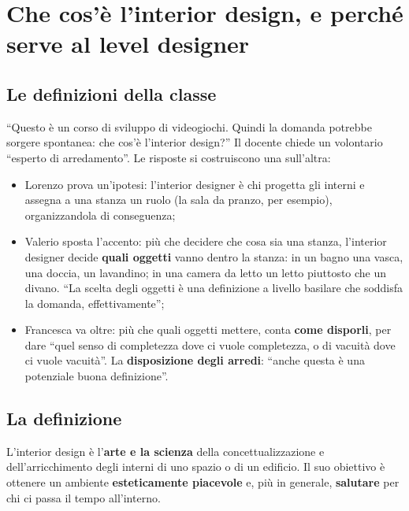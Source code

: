 \section{Che cos'è l'interior design, e perché serve al level designer}
\label{gd17:sec:interior}



\subsection{Le definizioni della classe}

``Questo è un corso di sviluppo di videogiochi. Quindi la domanda potrebbe sorgere
spontanea: che cos'è l'interior design?'' Il docente chiede un volontario ``esperto di
arredamento''. Le risposte si costruiscono una sull'altra:
\begin{itemize}
  \item Lorenzo prova un'ipotesi: l'interior designer è chi progetta gli interni e
        assegna a una stanza un ruolo (la sala da pranzo, per esempio), organizzandola
        di conseguenza;
  \item Valerio sposta l'accento: più che decidere che cosa sia una stanza,
        l'interior designer decide \textbf{quali oggetti} vanno dentro la stanza: in un
        bagno una vasca, una doccia, un lavandino; in una camera da letto un letto
        piuttosto che un divano. ``La scelta degli oggetti è una definizione a livello
        basilare che soddisfa la domanda, effettivamente'';
  \item Francesca va oltre: più che quali oggetti mettere, conta \textbf{come
        disporli}, per dare ``quel senso di completezza dove ci vuole completezza, o
        di vacuità dove ci vuole vacuità''. La \textbf{disposizione degli arredi}:
        ``anche questa è una potenziale buona definizione''.
\end{itemize}

\subsection{La definizione}

\begin{definition}
L'interior design è l'\textbf{arte e la scienza} della concettualizzazione e
dell'arricchimento degli interni di uno spazio o di un edificio. Il suo obiettivo è
ottenere un ambiente \textbf{esteticamente piacevole} e, più in generale,
\textbf{salutare} per chi ci passa il tempo all'interno.
\end{definition}

